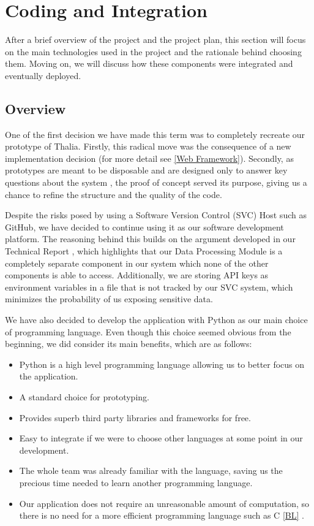 \documentclass[main.tex]{subfiles}
\begin{document}
\section{Coding and Integration}

After a brief overview of the project and the project plan, this section will focus on the main technologies used in the project and the rationale behind choosing them. Moving on, we will discuss how these components were integrated and eventually deployed.

\subsection{Overview}

One of the first decision we have made this term was to completely recreate our prototype of Thalia. Firstly, this radical move was the consequence of a new implementation decision (for more detail see \ref{Web Framework}). Secondly, as prototypes are meant to be disposable and are designed only to answer key questions about the system \cite{pragmaticprog}, the proof of concept served its purpose, giving us a chance to refine the structure and the quality of the code.

Despite the risks posed by using a Software Version Control (SVC) Host such as GitHub, we have decided to continue using it as our software development platform. The reasoning behind this builds on the argument developed in our Technical Report \cite{TR}, which highlights that our Data Processing Module is a completely separate component in our system which none of the other components is able to access. Additionally, we are storing API keys as environment variables in a file that is not tracked by our SVC system, which minimizes the probability of us exposing sensitive data.

We have also decided to develop the application with Python as our main choice of programming language. Even though this choice seemed obvious from the beginning, we did consider its main benefits, which are as follows:

\begin{itemize}
    \item Python is a high level programming language allowing us to better focus on the application.
    \item A standard choice for prototyping.
    \item Provides superb third party libraries and frameworks for free.
    \item Easy to integrate if we were to choose other languages at some point in our development.
    \item The whole team was already familiar with the language, saving us the precious time needed to learn another programming language.
    \item Our application does not require an unreasonable amount of computation, so there is no need for a more efficient programming language such as C \ref{BL} \cite{languagescomparison}.
\end{itemize}
\end{document}
